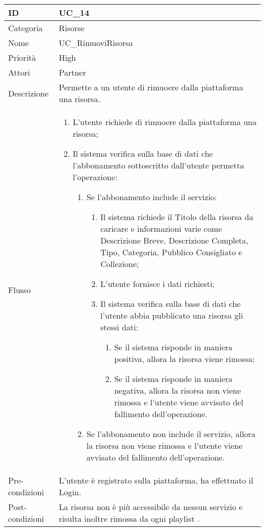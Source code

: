 \begin{center}
\begin{tabular}{ |p{2cm}|p{13cm}|  }
\hline
ID & UC\_14 \\\hline
Categoria & Risorse\\\hline
Nome & UC\_RimuoviRisorsa\\\hline
Priorità & High \\\hline
Attori &  Partner \\\hline
Descrizione & Permette a un utente di rimuoere dalla piattaforma una risorsa.\\\hline
Flusso &  	\begin{enumerate}
			\item L'utente richiede di rimuoere dalla piattaforma una risorsa;
			\item Il sistema verifica sulla base di dati che l'abbonamento sottoscritto dall'utente permetta l'operazione:
			\begin{enumerate}
				\item Se l'abbonamento include il servizio:
				\begin{enumerate}
					\item Il sistema richiede il Titolo della risorsa da caricare e informazioni varie come Descrizione Breve,  Descrizione Completa, Tipo, Categoria, Pubblico Consigliato e Collezione;
					\item L'utente fornisce i dati richiesti;
					\item Il sistema verifica sulla base di dati che l'utente abbia pubblicato una risorsa gli stessi dati:
					\begin{enumerate}
						\item Se il sistema risponde in maniera positiva, allora la risorsa viene rimossa;
						\item Se il sistema risponde in maniera negativa, allora  la risorsa non viene rimossa e l'utente viene avvisato del fallimento dell'operazione.
					\end{enumerate}
				\end{enumerate}
				\item Se l'abbonamento non include il servizio, allora la risorsa non viene rimossa e l'utente viene avvisato del fallimento dell'operazione.
			\end{enumerate}
		\end{enumerate}\\\hline
Pre-condizioni & L'utente è registrato sulla piattaforma, ha effettuato il Login.\\\hline
Post-condizioni & La risorsa non è più accessibile da nessun servizio e risulta inoltre rimossa da ogni playlist .\\\hline
\end{tabular}
\label{table_use_case:14}\newline


\end{center}
